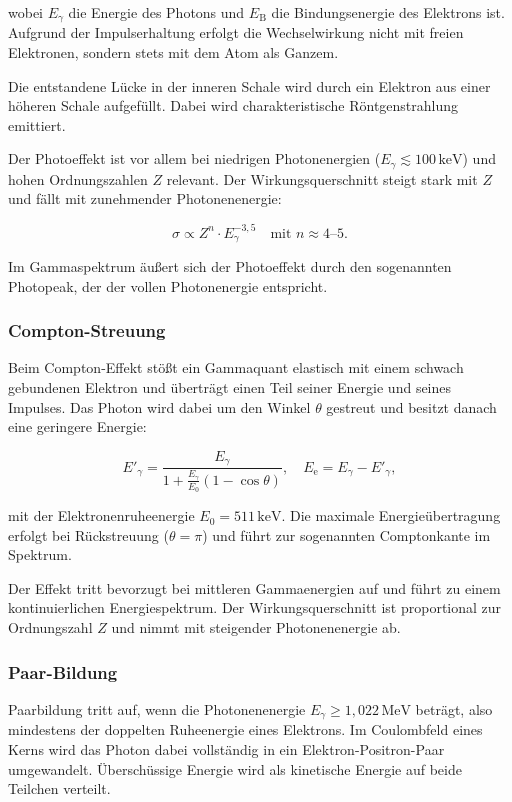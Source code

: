 wobei \( E_\gamma \) die Energie des Photons und \( E_\text{B} \) die Bindungsenergie des Elektrons ist. Aufgrund der Impulserhaltung erfolgt die Wechselwirkung nicht mit freien Elektronen, sondern stets mit dem Atom als Ganzem.

Die entstandene Lücke in der inneren Schale wird durch ein Elektron aus einer höheren Schale aufgefüllt. Dabei wird charakteristische Röntgenstrahlung emittiert.

Der Photoeffekt ist vor allem bei niedrigen Photonenergien (\( E_\gamma \lesssim 100\,\text{keV} \)) und hohen Ordnungszahlen \( Z \) relevant. Der Wirkungsquerschnitt steigt stark mit \( Z \) und fällt mit zunehmender Photonenenergie:

\[
\sigma \propto Z^n \cdot E_\gamma^{-3{,}5} \quad \text{mit } n \approx 4\text{–}5.
\]

Im Gammaspektrum äußert sich der Photoeffekt durch den sogenannten Photopeak, der der vollen Photonenergie entspricht.

\subsubsection{Compton-Streuung}

Beim Compton-Effekt stößt ein Gammaquant elastisch mit einem schwach gebundenen Elektron und überträgt einen Teil seiner Energie und seines Impulses. Das Photon wird dabei um den Winkel \( \theta \) gestreut und besitzt danach eine geringere Energie:

\[
E'_\gamma = \frac{E_\gamma}{1 + \frac{E_\gamma}{E_0}(1 - \cos\theta)}, \quad E_\text{e} = E_\gamma - E'_\gamma,
\]

mit der Elektronenruheenergie \( E_0 = 511\,\text{keV} \). Die maximale Energieübertragung erfolgt bei Rückstreuung (\( \theta = \pi \)) und führt zur sogenannten Comptonkante im Spektrum.

Der Effekt tritt bevorzugt bei mittleren Gammaenergien auf und führt zu einem kontinuierlichen Energiespektrum. Der Wirkungsquerschnitt ist proportional zur Ordnungszahl \( Z \) und nimmt mit steigender Photonenenergie ab.

\subsubsection{Paar-Bildung}


Paarbildung tritt auf, wenn die Photonenenergie \( E_\gamma \geq 1{,}022\,\text{MeV} \) beträgt, also mindestens der doppelten Ruheenergie eines Elektrons. Im Coulombfeld eines Kerns wird das Photon dabei vollständig in ein Elektron-Positron-Paar umgewandelt. Überschüssige Energie wird als kinetische Energie auf beide Teilchen verteilt.

